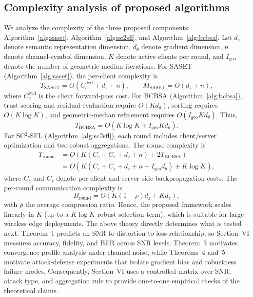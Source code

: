 \documentclass[10pt,journal]{IEEEtran}
\begin{document}
\subsection{Complexity analysis of proposed algorithms}
We analyze the complexity of the three proposed components: Algorithm~\ref{alg:saset}, Algorithm~\ref{alg:sc2sfl}, and Algorithm~\ref{alg:bcbsa}. Let $d_z$ denote semantic representation dimension, $d_\theta$ denote gradient dimension, $n$ denote channel-symbol dimension, $K$ denote active clients per round, and $I_{\mathrm{geo}}$ denote the number of geometric-median iterations.
For SASET (Algorithm~\ref{alg:saset}), the per-client complexity is
\begin{equation}
T_{\mathrm{SASET}} = O\left(C_c^{\mathrm{fwd}} + d_z + n\right),
\qquad
M_{\mathrm{SASET}} = O(d_z+n),
\end{equation}
where $C_c^{\mathrm{fwd}}$ is the client forward-pass cost.
For BCBSA (Algorithm~\ref{alg:bcbsa}), trust scoring and residual evaluation require $O(Kd_\theta)$, sorting requires $O(K\log K)$, and geometric-median refinement requires $O(I_{\mathrm{geo}}Kd_\theta)$. Thus,
\begin{equation}
T_{\mathrm{BCBSA}}
=
O\left(K\log K + I_{\mathrm{geo}}Kd_\theta\right).
\end{equation}
For SC$^2$-SFL (Algorithm~\ref{alg:sc2sfl}), each round includes client/server optimization and two robust aggregations. The round complexity is
\begin{equation}
\begin{aligned}
T_{\mathrm{round}}
&=
O\left(K\left(C_c + C_s + d_z + n\right) + 2T_{\mathrm{BCBSA}}\right) \\
&=
O\left(K\left(C_c + C_s + d_z + n + I_{\mathrm{geo}}d_\theta\right) + K\log K\right),
\end{aligned}
\end{equation}
where $C_c$ and $C_s$ denote per-client and server-side backpropagation costs. The per-round communication complexity is
\begin{equation}
B_{\mathrm{round}}
=
O\left(K(1-\bar{\rho})d_z + Kd_z\right),
\end{equation}
with $\bar{\rho}$ the average compression ratio. Hence, the proposed framework scales linearly in $K$ (up to a $K\log K$ robust-selection term), which is suitable for large wireless edge deployments.
The above theory directly determines what is tested next. Theorem~1 predicts an SNR-to-distortion-to-loss relationship, so Section~VI measures accuracy, fidelity, and BER across SNR levels. Theorem~3 motivates convergence-profile analysis under channel noise, while Theorems~4 and~5 motivate attack-defense experiments that isolate gradient bias and robustness failure modes. Consequently, Section~VI uses a controlled matrix over SNR, attack type, and aggregation rule to provide one-to-one empirical checks of the theoretical claims.
\end{document}
